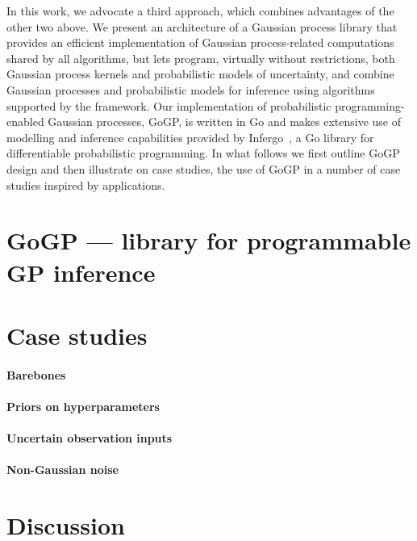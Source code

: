 \documentclass[sigplan,review]{acmart}\settopmatter{printfolios=true,printccs=false,printacmref=false}
\begin{document}
In this work, we advocate a third approach, which combines
advantages of the other two above. We present an architecture of
a Gaussian process library that provides an efficient
implementation of Gaussian process-related computations shared
by all algorithms, but lets program, virtually without
restrictions, both Gaussian process kernels and probabilistic
models of uncertainty, and combine Gaussian processes and
probabilistic models for inference using algorithms supported by
the framework. Our implementation of probabilistic
programming-enabled Gaussian processes, GoGP, is written in Go
and makes extensive use of modelling and inference capabilities
provided by Infergo~\cite{}, a Go library for differentiable
probabilistic programming. In what follows we first outline GoGP
design  and then illustrate on case studies, the use of GoGP in
a number of case studies inspired by applications.

\section{GoGP --- library for programmable GP inference}

\section{Case studies}

\paragraph{Barebones}

\paragraph{Priors on hyperparameters}

\paragraph{Uncertain observation inputs}

\paragraph{Non-Gaussian noise}

\section{Discussion}


\end{document}

